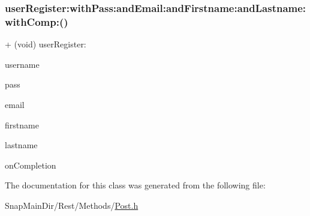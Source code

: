 \subsubsection{\texorpdfstring{user\+Register\+:with\+Pass\+:and\+Email\+:and\+Firstname\+:and\+Lastname\+:with\+Comp\+:()}{userRegister:withPass:andEmail:andFirstname:andLastname:withComp:()}}
{\footnotesize\ttfamily + (void) user\+Register\+: \begin{DoxyParamCaption}\item[{(N\+S\+String $\ast$)}]{username }\item[{withPass:(N\+S\+String $\ast$)}]{pass }\item[{andEmail:(N\+S\+String $\ast$)}]{email }\item[{andFirstname:(N\+S\+String $\ast$)}]{firstname }\item[{andLastname:(N\+S\+String $\ast$)}]{lastname }\item[{withComp:(void($^\wedge$)(B\+O\+OL, id))}]{on\+Completion }\end{DoxyParamCaption}}



The documentation for this class was generated from the following file\+:\begin{DoxyCompactItemize}
\item 
Snap\+Main\+Dir/\+Rest/\+Methods/\hyperlink{_post_8h}{Post.\+h}\end{DoxyCompactItemize}
